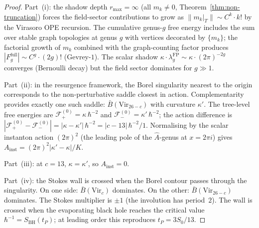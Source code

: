 \documentclass[11pt,reqno]{amsart}
\theoremstyle{definition}
\theoremstyle{remark}
\providecommand{\barB}{\bar{B}}
\begin{document}
\begin{proof}
Part~(i): the shadow depth $r_{\max} = \infty$ (all $m_k \ne 0$,
Theorem~\ref{thm:non-truncation}) forces the field-sector
contributions to grow as $\|m_k|_T\| \sim C^k\cdot k!$ by
the Virasoro OPE recursion. The cumulative genus-$g$ free
energy includes the sum over stable graph topologies at genus
$g$ with vertices decorated by $\{m_k\}$; the factorial growth
of $m_k$ combined with the graph-counting factor produces
$|F_g^{\mathrm{full}}| \sim C^g\cdot(2g)!$ (Gevrey-$1$).
The scalar shadow $\kappa\cdot\lambda_g^{\mathrm{FP}}
\sim \kappa\cdot(2\pi)^{-2g}$ converges (Bernoulli decay)
but the field sector dominates for $g \gg 1$.

Part~(ii): in the resurgence framework, the Borel singularity
nearest to the origin corresponds to the non-perturbative saddle
closest in action. Complementarity provides exactly one such
saddle: $\barB(\mathrm{Vir}_{26-c})$ with curvature $\kappa'$.
The tree-level free energies are
$\mathcal{F}_+^{(0)} = \kappa\,\hbar^{-2}$ and
$\mathcal{F}_-^{(0)} = \kappa'\,\hbar^{-2}$; the action
difference is
$|\mathcal{F}_+^{(0)} - \mathcal{F}_-^{(0)}|
= |\kappa - \kappa'|\,\hbar^{-2}
= |c - 13|\,\hbar^{-2}/1$.
Normalising by the scalar instanton action $(2\pi)^2$ (the
leading pole of the $\hat{A}$-genus at $x = 2\pi i$) gives
$A_{\mathrm{inst}} = (2\pi)^2|\kappa'-\kappa|/K$.

Part~(iii): at $c = 13$, $\kappa = \kappa'$, so
$A_{\mathrm{inst}} = 0$.

Part~(iv): the Stokes wall is crossed when the Borel contour
passes through the singularity. On one side:
$\barB(\mathrm{Vir}_c)$ dominates. On the other:
$\barB(\mathrm{Vir}_{26-c})$ dominates. The Stokes multiplier
is $\pm 1$ (the involution has period~$2$). The wall is
crossed when the evaporating black hole reaches the critical
value $\hbar^{-1} = S_{\mathrm{BH}}(t_P)$; at leading order
this reproduces $t_P = 3S_0/13$.
\end{proof}
\end{document}

